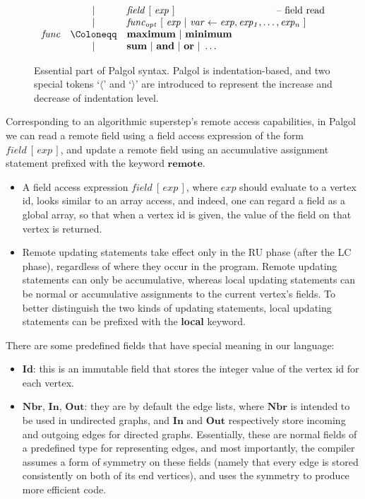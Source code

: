 \documentclass{sokendai_thesis} %
\newcommand{\hsp}[1]{\hspace{-4em}\hbox{#1}}
\begin{document}
\begin{figure}[t]
\[\begin{array}{lclr}
 & | & \mathit{field}~[~\mathit{exp}~] & \hsp{-- field read} \\
 & | & \mathit{func_{opt}}~[~\mathit{exp}~|~\mathit{var}\leftarrow\mathit{exp},\mathit{exp_1},\ldots,\mathit{exp_n}~] \\
\mathit{func}  & \Coloneqq & \mathbf{maximum}~|~\mathbf{minimum} \\
 & | & \mathbf{sum}~|~\mathbf{and}~|~\mathbf{or}~|~\ldots \\
 \end{array}
\]
\caption{Essential part of Palgol syntax. Palgol is indentation-based, and two special tokens `$\langle$' and `$\rangle$' are introduced to represent the increase and decrease of indentation level.}
\label{fig:syntax-simplified}
\vspace{-2ex}
\end{figure}

Corresponding to an algorithmic superstep's remote access capabilities, in Palgol we can read a remote field using a field access expression of the form $\mathit{field}~[\,\mathit{exp}\,]$, and update a remote field using an accumulative assignment statement prefixed with the keyword $\mathbf{remote}$.
\begin{itemize}
\item A field access expression $\mathit{field}~[\,\mathit{exp}\,]$, where $\mathit{exp}$ should evaluate to a vertex id, looks similar to an array access, and indeed, one can regard a field as a global array, so that when a vertex id is given, the value of the field on that vertex is returned.
\item Remote updating statements take effect only in the RU phase (after the LC phase), regardless of where they occur in the program.
Remote updating statements can only be accumulative, whereas local updating statements can be normal or accumulative assignments to the current vertex's fields.
To better distinguish the two kinds of updating statements, local updating statements can be prefixed with the \textbf{local} keyword.
\end{itemize}

There are some predefined fields that have special meaning in our language:
\begin{itemize}
 \item $\mathbf{Id}$: this is an immutable field that stores the integer value of the vertex id for each vertex.
 \item $\mathbf{Nbr}$, $\mathbf{In}$, $\mathbf{Out}$: they are by default the edge lists, where $\mathbf{Nbr}$ is intended to be used in undirected graphs, and $\mathbf{In}$ and $\mathbf{Out}$ respectively store incoming and outgoing edges for directed graphs.
 Essentially, these are normal fields of a predefined type for representing edges, and most importantly, the compiler assumes a form of symmetry on these fields (namely that every edge is stored consistently on both of its end vertices), and uses the symmetry to produce more efficient code.
\end{itemize}
\end{document}
